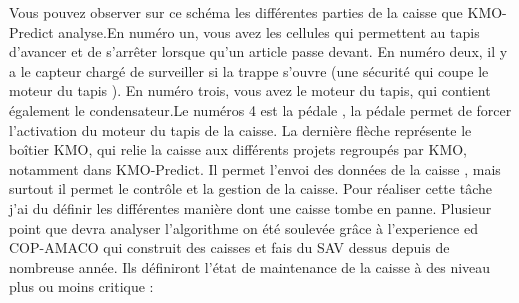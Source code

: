 \documentclass[12pt]{article}
\begin{document}
\justify
\text Vous pouvez observer sur ce schéma les différentes parties de la caisse que KMO-Predict analyse.En numéro un, vous avez les cellules qui permettent au tapis d'avancer et de s'arrêter lorsque qu'un article passe devant. En numéro deux, il y a le capteur chargé de surveiller si la trappe s'ouvre (une sécurité qui coupe le moteur du tapis ). En numéro trois, vous avez le moteur du tapis, qui contient également le condensateur.Le numéros 4 est la pédale , la pédale permet de forcer l'activation du moteur du tapis de la caisse. La dernière flèche représente le boîtier KMO, qui relie la caisse aux différents projets regroupés par KMO, notamment dans KMO-Predict. Il permet l'envoi des données de la caisse , mais surtout il permet le contrôle et la gestion de la caisse.
\justify
\text Pour réaliser cette tâche j'ai du définir les différentes manière dont une caisse tombe en panne. Plusieur point que devra analyser l'algorithme on été soulevée grâce à l'experience ed COP-AMACO qui construit des caisses et fais du SAV dessus depuis de nombreuse année. Ils définiront l'état de maintenance de la caisse à des niveau plus ou moins critique : 
\end{document}
